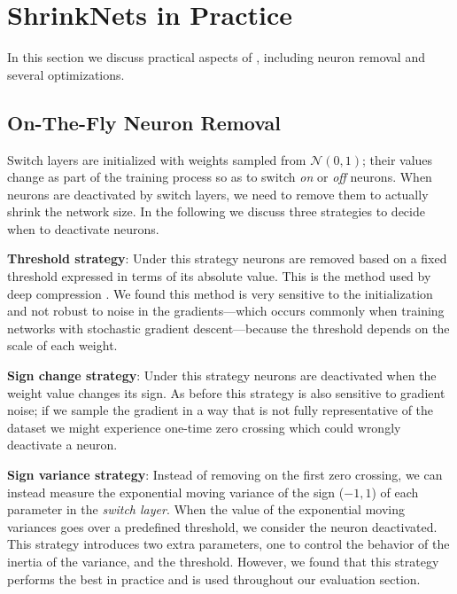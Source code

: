 
\section{ShrinkNets in Practice}

In this section we discuss practical aspects of \shrink{}, including 
neuron removal  and several optimizations.

\subsection{On-The-Fly Neuron Removal}
\label{neuron_killing}

Switch layers are initialized with weights sampled from $\mathcal{N}(0,1)$;
their values change as part of the training process so as to switch \emph{on}
or \emph{off} neurons. When neurons are deactivated by switch layers, we need
to remove them to actually shrink the network size.
In the following we discuss three strategies to decide when to deactivate neurons. 

\textbf{Threshold strategy}: Under this strategy neurons are removed based on
a fixed threshold expressed in terms of its absolute value. This is the method
used by deep compression \cite{Han2015}. We found this method is very sensitive to the initialization 
and not robust to noise in the gradients---which occurs commonly when training networks with
stochastic gradient descent---because the threshold depends on the scale of
each weight.

\textbf{Sign change strategy}: Under this strategy neurons are deactivated when the
weight value changes its sign. As before this strategy is also sensitive to gradient noise; if we sample the gradient in a way that is not fully representative of the dataset we might experience one-time zero crossing which could wrongly deactivate a neuron.

\textbf{Sign variance strategy}: Instead of removing on the first zero
crossing, we can instead measure the exponential moving variance of the sign
($-1, 1$) of each parameter in the \textit{switch layer}. When the value of
the exponential moving variances goes over a predefined threshold, we consider
the neuron deactivated. This strategy introduces
two extra parameters, one to control the behavior of the inertia of the
variance, and the threshold. 
However, we found that this strategy performs the best in practice and is used throughout our evaluation section. 


